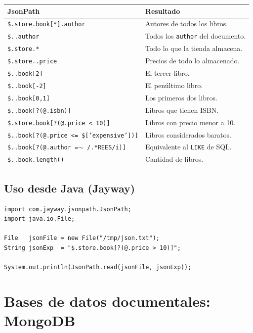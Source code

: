 \documentclass[11pt,a4paper]{article}
\begin{document}
\begin{center}
\begin{tabular}{ll}
\toprule
JsonPath & Resultado \\
\midrule
\texttt{\$.store.book[*].author}                   & Autores de todos los libros. \\
\texttt{\$..author}                                & Todos los \texttt{author} del documento. \\
\texttt{\$.store.*}                                & Todo lo que la tienda almacena. \\
\texttt{\$.store..price}                           & Precios de todo lo almacenado. \\
\texttt{\$..book[2]}                               & El tercer libro. \\
\texttt{\$..book[-2]}                              & El penúltimo libro. \\
\texttt{\$..book[0,1]}                             & Los primeros dos libros. \\
\texttt{\$..book[?(@.isbn)]}                       & Libros que tienen ISBN. \\
\texttt{\$.store.book[?(@.price < 10)]}            & Libros con precio menor a 10. \\
\texttt{\$..book[?(@.price <= \$['expensive'])]}   & Libros considerados baratos. \\
\texttt{\$..book[?(@.author =$\sim$ /.*REES/i)]}   & Equivalente al \texttt{LIKE} de SQL. \\
\texttt{\$..book.length()}                         & Cantidad de libros. \\
\bottomrule
\end{tabular}
\end{center}

\subsection{Uso desde Java (Jayway)}

\begin{lstlisting}
import com.jayway.jsonpath.JsonPath;
import java.io.File;

File   jsonFile = new File("/tmp/json.txt");
String jsonExp  = "$.store.book[?(@.price > 10)]";

System.out.println(JsonPath.read(jsonFile, jsonExp));
\end{lstlisting}

\section{Bases de datos documentales: MongoDB}
\end{document}
